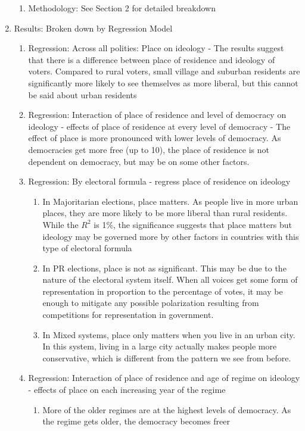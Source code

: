 \documentclass[12pt]{article}
\begin{document}
\begin{enumerate}
\begin{enumerate}
	\item Methodology: See Section 2 for detailed breakdown
\end{enumerate}
\item Results: Broken down by Regression Model
\begin{enumerate}
	\item Regression: Across all polities: Place on ideology - The results suggest that there is a difference between place of residence and ideology of voters. Compared to rural voters, small village and suburban residents are significantly more likely to see themselves as more liberal, but this cannot be said about urban residents 
	\item Regression: Interaction of place of residence and level of democracy on ideology - effects of place of residence at every level of democracy - The effect of place is more pronounced with lower levels of democracy. As democracies get more free (up to 10), the place of residence is not dependent on democracy, but may be on some other factors.
	\item Regression: By electoral formula - regress place of residence on ideology
	\begin{enumerate}
		\item In Majoritarian elections, place matters. As people live in more urban places, they are more likely to be more liberal than rural residents. While the $R^2$ is 1\%, the significance suggests that place matters but ideology may be governed more by other factors in countries with this type of electoral formula
		\item In PR elections, place is not as significant. This may be due to the nature of the electoral system itself. When all voices get some form of representation in proportion to the percentage of votes, it may be enough to mitigate any possible polarization resulting from competitions for representation in government.
		\item In Mixed systems, place only matters when you live in an urban city. In this system, living in a large city actually makes people more conservative, which is different from the pattern we see from before.
	\end{enumerate}
	\item Regression: Interaction of place of residence and age of regime on ideology - effects of place on each increasing year of the regime
	\begin{enumerate}
		\item More of the older regimes are at the highest levels of democracy. As the regime gets older, the democracy becomes freer

\end{enumerate}
\end{enumerate}
\end{enumerate}
\end{document}
